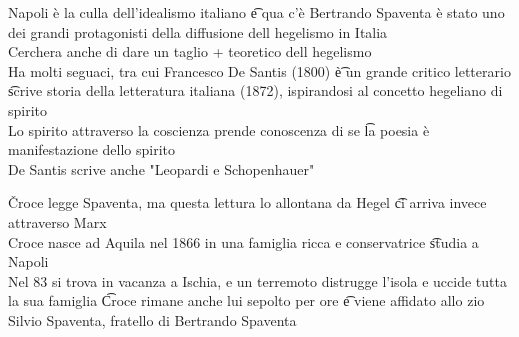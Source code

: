 \documentclass[12pt]{article}
\begin{document}
Napoli è la culla dell'idealismo italiano \t e qua c'è Bertrando Spaventa è stato uno dei grandi protagonisti della diffusione dell hegelismo in Italia \\
Cerchera anche di dare un taglio + teoretico dell hegelismo \\
Ha molti seguaci, tra cui Francesco De Santis (1800) \t è un grande critico letterario \t scrive storia della letteratura italiana (1872), ispirandosi al concetto hegeliano di spirito \\
Lo spirito attraverso la coscienza prende conoscenza di se \t la poesia è manifestazione dello spirito \\
De Santis scrive anche "Leopardi e Schopenhauer" 

\v

Croce legge Spaventa, ma questa lettura lo allontana da Hegel \t ci arriva invece attraverso Marx \\
Croce nasce ad Aquila nel 1866 in una famiglia ricca e conservatrice \t studia a Napoli \\
Nel 83 si trova in vacanza a Ischia, e un terremoto distrugge l'isola e uccide tutta la sua famiglia \t Croce rimane anche lui sepolto per ore \t e viene affidato allo zio Silvio Spaventa, fratello di Bertrando Spaventa
\end{document}
